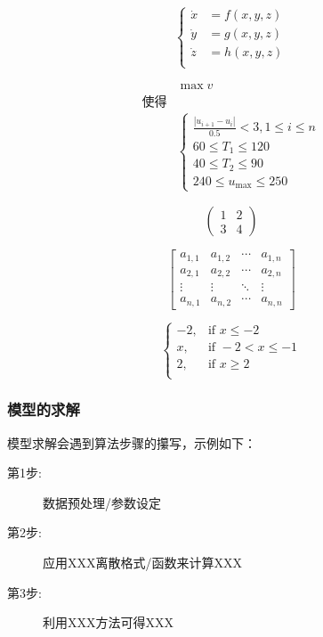 \documentclass[12pt,utf8]{article}
\begin{document}
\begin{equation}
\left\{
\begin{aligned}
 \dot{x}&=f(x,y,z)\\
 \dot{y}&=g(x,y,z)\\
 \dot{z}&=h(x,y,z)\\
\end{aligned}
\right.
\end{equation}

\begin{equation*}
\begin{aligned}
&\max v  \\
\text{使得} & \\
&\begin{cases}
  \frac{|u_{i+1}-u_{i}|}{0.5}<3, 1\le i\le n\\
  60\le T_1 \le 120\\
  40 \le T_2 \le 90 \\
  240 \le u_{\text{max}} \le 250
\end{cases}
\end{aligned}
\end{equation*}

\[
\begin{pmatrix}
1 & 2 \\
3 & 4
\end{pmatrix}
\]

\[
 \begin{bmatrix}
   a_{1,1} & a_{1,2} & \cdots & a_{1,n} \\
   a_{2,1} & a_{2,2} & \cdots & a_{2,n} \\
   \vdots  & \vdots  & \ddots & \vdots  \\
   a_{n,1} & a_{n,2} & \cdots & a_{n,n} 
 \end{bmatrix}
\]

\[
\begin{cases}
 -2, & \text{if~} x\le-2 \\
 x, & \text{if~}  -2<x\le-1 \\
 2,  & \text{if~}  x\ge2 \\
\end{cases}
\]


\subsubsection{模型的求解}

模型求解会遇到算法步骤的攥写，示例如下：

\begin{description}
\item[第1步:] 数据预处理/参数设定
\item[第2步:] 应用XXX离散格式/函数来计算XXX
\item[第3步:] 利用XXX方法可得XXX
\end{description}
\end{document}
